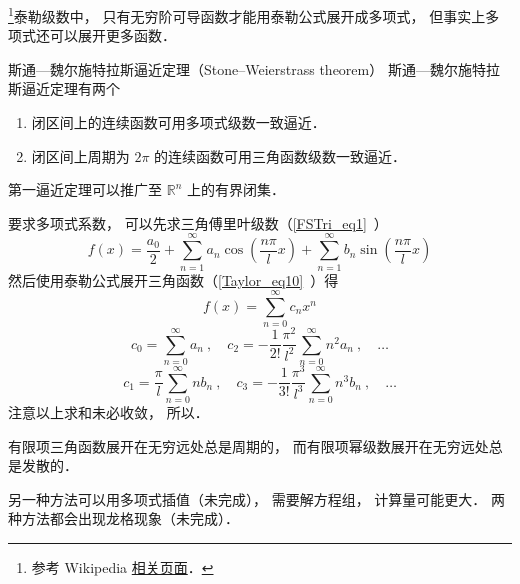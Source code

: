 \begin{issues}
\issueDraft
\end{issues}


\footnote{参考 Wikipedia \href{https://en.wikipedia.org/wiki/Stone–Weierstrass theorem}{相关页面}．}泰勒级数中， 只有无穷阶可导函数才能用泰勒公式展开成多项式， 但事实上多项式还可以展开更多函数．

\begin{theorem}{斯通—魏尔施特拉斯逼近定理（Stone–Weierstrass theorem）}
斯通—魏尔施特拉斯逼近定理有两个
\begin{enumerate}
\item 闭区间上的连续函数可用多项式级数一致逼近．
\item 闭区间上周期为 $2\pi$ 的连续函数可用三角函数级数一致逼近．
\end{enumerate}
第一逼近定理可以推广至 $\mathbb {R}^{n}$ 上的有界闭集．
\end{theorem}

要求多项式系数， 可以先求三角傅里叶级数（\autoref{FSTri_eq1}~）
\begin{equation}
f(x) = \frac{a_0}{2} + \sum_{n = 1}^\infty a_n \cos (\frac{n\pi}{l}x) + \sum_{n = 1}^\infty b_n \sin (\frac{n\pi}{l}x)
\end{equation}
然后使用泰勒公式展开三角函数（\autoref{Taylor_eq10}~）得
\begin{equation}
f(x) = \sum_{n=0}^\infty c_n x^n
\end{equation}
\begin{equation}
c_0 = \sum_{n=0}^\infty a_n~,
\quad
c_2 = -\frac{1}{2!}\frac{\pi^2}{l^2} \sum_{n=0}^\infty n^2 a_n~, \quad \dots
\end{equation}
\begin{equation}
c_1 = \frac{\pi}{l} \sum_{n=0}^\infty n b_n~,
\quad
c_3 = -\frac{1}{3!}\frac{\pi^3}{l^3} \sum_{n=0}^\infty n^3 b_n~, \quad \dots
\end{equation}
注意以上求和未必收敛， 所以．

有限项三角函数展开在无穷远处总是周期的， 而有限项幂级数展开在无穷远处总是发散的．

另一种方法可以用多项式插值（未完成）， 需要解方程组， 计算量可能更大． 两种方法都会出现龙格现象（未完成）．
